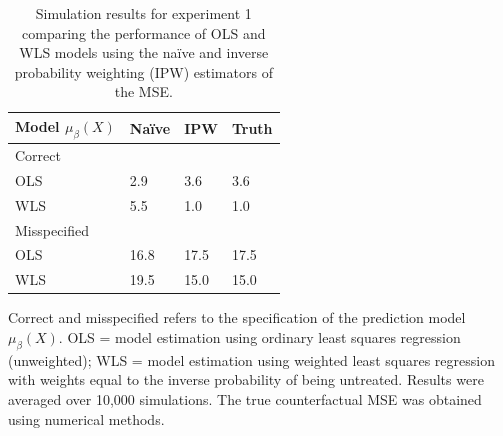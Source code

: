 \begin{table}[t]
    \centering
    \caption{Simulation results for experiment 1 comparing the performance of OLS and WLS models using the na\"{i}ve and inverse probability weighting (IPW) estimators of the MSE.}
    \begin{threeparttable}
        \begin{tabular}{p{3cm}R{1.25cm}R{1.25cm}R{1.25cm}}
        \toprule
        Model $\mu_{\beta}(X)$ & Na\"{i}ve & IPW & Truth  \\
        \midrule
        Correct & & & \\
        \hspace{1em}OLS & 2.9 & 3.6 & 3.6\\
        \hspace{1em}WLS & 5.5 & 1.0 & 1.0\\
        \addlinespace[0.25em]
        Misspecified & & & \\
        \hspace{1em}OLS & 16.8 & 17.5 & 17.5\\
        \hspace{1em}WLS & 19.5 & 15.0 & 15.0\\
        \bottomrule
        \end{tabular}
        \begin{tablenotes}
        \item \noindent Correct and misspecified refers to the specification of the  prediction model $\mu_\beta(X)$. OLS = model estimation using ordinary least squares regression (unweighted); WLS = model estimation using weighted least squares regression with weights equal to the inverse probability of being untreated. Results were averaged over 10,000 simulations. The true counterfactual MSE was obtained using numerical methods. 
        \end{tablenotes}
        \end{threeparttable}
    
\end{table}

